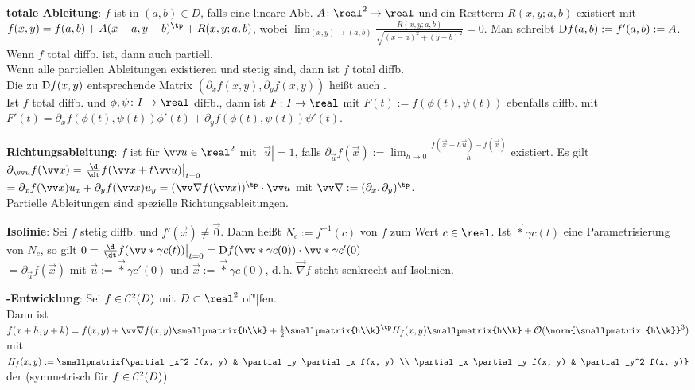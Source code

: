 \linie

\textbf{totale Ableitung}:
$f$ ist  in $(a, b) \in D$, falls eine lineare Abb.
$A\colon \real^2 \to \real$ und ein Restterm $R(x, y; a, b)$ existiert mit
$f(x, y) = f(a, b) + A (x - a, y - b)^\tp + R(x, y; a, b)$, wobei
$\lim_{(x, y) \to (a, b)} \frac{R(x, y; a, b)}{\sqrt{(x - a)^2 + (y - b)^2}} = 0$.
Man schreibt $\mathop{}\!\mathrm{D} f(a, b) := f'(a, b) := A$.\\
Wenn $f$ total diffb. ist, dann auch partiell.\\
Wenn alle partiellen Ableitungen existieren und stetig sind, dann ist $f$ total diffb.\\
Die zu $\mathop{}\!\mathrm{D} f(x, y)$ entsprechende Matrix $(\partial_x f(x, y), \partial_y f(x, y))$
heißt auch .\\
Ist $f$ total diffb. und $\phi, \psi\colon I \to \real$ diffb., dann
ist $F\colon I \to \real$ mit $F(t) := f(\phi(t), \psi(t))$ ebenfalls diffb. mit
$F'(t) = \partial_x f(\phi(t), \psi(t)) \phi'(t) + \partial_y f(\phi(t), \psi(t)) \psi'(t)$.

\linie

\textbf{Richtungsableitung}:
$f$ ist  für $\vec{u} \in \real^2$ mit $|\vec{u}| = 1$,
falls
$\partial_{\vec{u}} f(\vec{x}) := \lim_{h \to 0} \frac{f(\vec{x} + h\vec{u}) - f(\vec{x})}{h}$
existiert.
Es gilt $\partial_{\vec{u}} f(\vec{x})
= \left.\frac{\d}{\dt} f(\vec{x} + t\vec{u})\right|_{t=0}$\\
$= \partial_x f(\vec{x}) u_x + \partial_y f(\vec{x}) u_y
= (\vec{\nabla} f(\vec{x}))^\tp \cdot \vec{u}$
mit $\vec{\nabla} := (\partial_x, \partial_y)^\tp$.\\
Partielle Ableitungen sind spezielle Richtungsableitungen.

\linie

\textbf{Isolinie}:
Sei $f$ stetig diffb. und $f'(\vec{x}) \not= \vec{0}$.
Dann heißt $N_c := f^{-1}(c)$  von $f$ zum Wert $c \in \real$.
Ist $\vec*{\gamma}{c}(t)$ eine Parametrisierung von $N_c$, so gilt
$0 = \left.\frac{\d}{\dt} f(\vec*{\gamma}{c}(t))\right|_{t=0}
= \D f(\vec*{\gamma}{c}(0)) \cdot \vec*{\gamma}{c}'(0)$\\
$= \partial_{\vec{u}} f(\vec{x})$
mit $\vec{u} := \vec*{\gamma}{c}'(0)$ und $\vec{x} := \vec*{\gamma}{c}(0)$,
d.\,h. $\vec{\nabla} f$ steht senkrecht auf Isolinien.

\linie

\textbf{-Entwicklung}:
Sei $f \in \mathcal{C}^2(D)$ mit $D \subset \real^2$ of"|fen.\\
Dann ist $f(x + h, y + k) = f(x, y) + \vec{\nabla} f(x, y) \smallpmatrix{h\\k} +
\frac{1}{2} \smallpmatrix{h\\k}^\tp H_f(x, y) \smallpmatrix{h\\k} +
\O(\norm{\smallpmatrix{h\\k}}^3)$ mit\\
$H_f(x, y) := \smallpmatrix{\partial_x^2 f(x, y) & \partial_y \partial_x f(x, y) \\
\partial_x \partial_y f(x, y) & \partial_y^2 f(x, y)}$ der 
(symmetrisch für $f \in \mathcal{C}^2(D)$).

